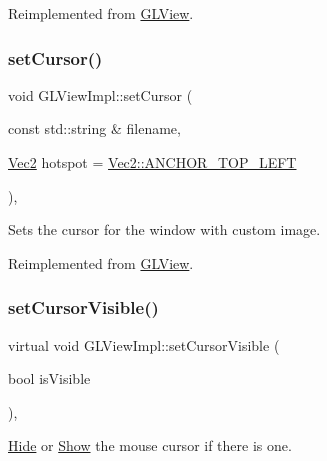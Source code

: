 Reimplemented from \hyperlink{classGLView_a40714c1d078f964bb51d12228af98054}{G\+L\+View}.

\mbox{\label{classGLViewImpl_a80189f01cb7314cd79fb37ccc5a1d779}} 
\subsubsection{\texorpdfstring{set\+Cursor()}{setCursor()}}
{\footnotesize\ttfamily void G\+L\+View\+Impl\+::set\+Cursor (\begin{DoxyParamCaption}\item[{const std\+::string \&}]{filename,  }\item[{\hyperlink{classVec2}{Vec2}}]{hotspot = {\ttfamily \hyperlink{classVec2_ab0533215e446e0381d01bf49edd7ab7c}{Vec2\+::\+A\+N\+C\+H\+O\+R\+\_\+\+T\+O\+P\+\_\+\+L\+E\+FT}} }\end{DoxyParamCaption})\hspace{0.3cm}{\ttfamily [override]}, {\ttfamily [virtual]}}

Sets the cursor for the window with custom image. 

Reimplemented from \hyperlink{classGLView_ab9defa8d2bbfb495da622958e2f9a500}{G\+L\+View}.

\mbox{\label{classGLViewImpl_a7e609efc4d34d98544b42e5f18ff29b8}} 
\subsubsection{\texorpdfstring{set\+Cursor\+Visible()}{setCursorVisible()}\hspace{0.1cm}{\footnotesize\ttfamily [1/3]}}
{\footnotesize\ttfamily virtual void G\+L\+View\+Impl\+::set\+Cursor\+Visible (\begin{DoxyParamCaption}\item[{bool}]{is\+Visible }\end{DoxyParamCaption})\hspace{0.3cm}{\ttfamily [override]}, {\ttfamily [virtual]}}

\hyperlink{classHide}{Hide} or \hyperlink{classShow}{Show} the mouse cursor if there is one.


